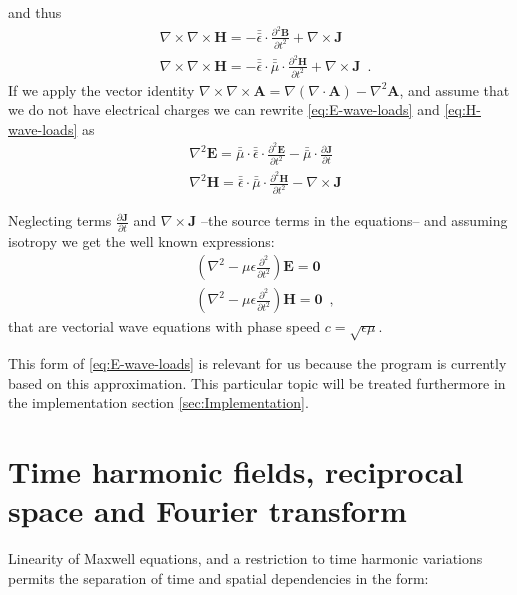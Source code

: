 and thus
\begin{align}
&\nabla\times\nabla\times \mathbf{H} = -\bar{\bar{\epsilon}}\cdot  \frac{\partial^2 \mathbf{B}}{\partial t^2} +  \nabla\times\mathbf{J} \nonumber \\
&\nabla\times\nabla\times \mathbf{H} = -\bar{\bar{\epsilon}}\cdot  \bar{\bar{\mu}}\cdot\frac{\partial^2 \mathbf{H}}{\partial t^2} + \nabla\times\mathbf{J} \label{eq:H-wave-loads} \enspace .
\end{align}
If we apply the vector identity $\nabla\times\nabla\times \mathbf{A} = \nabla(\nabla\cdot\mathbf{A}) - \nabla^2 \mathbf{A}$, and assume that we do not have electrical charges we can rewrite \eqref{eq:E-wave-loads} and \eqref{eq:H-wave-loads} as
\begin{align}
&\nabla^2 \mathbf{E} = \bar{\bar{\mu}}\cdot\bar{\bar{\epsilon}}\cdot \frac{\partial^2 \mathbf{E}}{\partial t^2} - \bar{\bar{\mu}}\cdot \frac{\partial \mathbf{J}}{\partial t} \\
&\nabla^2 \mathbf{H} = \bar{\bar{\epsilon}}\cdot\bar{\bar{\mu}}\cdot \frac{\partial^2 \mathbf{H}}{\partial t^2} - \nabla\times \mathbf{J}
\end{align}


Neglecting terms $\frac{\partial \mathbf{J}}{\partial t}$ and $\nabla\times \mathbf{J}$ --the source terms in the equations-- and assuming isotropy we get the well known expressions:
\begin{align}
&\left(\nabla^2 - \mu\epsilon \frac{\partial^2}{\partial t^2} \right) \mathbf{E} = \mathbf{0} \label{eq:E-wave-homo}\\
&\left(\nabla^2 - \mu\epsilon \frac{\partial^2}{\partial t^2} \right) \mathbf{H} = \mathbf{0} \label{eq:H-wave-homo} \enspace ,
\end{align}
that are vectorial wave equations with phase speed $c = \sqrt{\epsilon \mu}$. 

This form of \eqref{eq:E-wave-loads} is relevant for us because the program is currently based on this approximation. This particular topic will be treated furthermore in the implementation section \ref{sec:Implementation}.


\section{Time harmonic fields, reciprocal space and Fourier transform}

Linearity of Maxwell equations, and a restriction to time harmonic variations permits the separation of time and spatial dependencies in the form:

